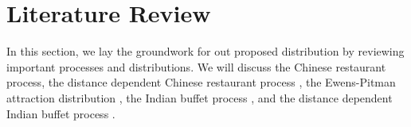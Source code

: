 
\chapter{Literature Review} %
In this section, we lay the groundwork for out proposed distribution by reviewing
important processes and distributions. We will discuss the Chinese restaurant
process, the distance dependent Chinese restaurant process \citep{ddcrp}, the
Ewens-Pitman attraction distribution \citep{epa}, the Indian buffet process
\citep{ibp}, and the distance dependent Indian buffet process \citep{ddibp}.


